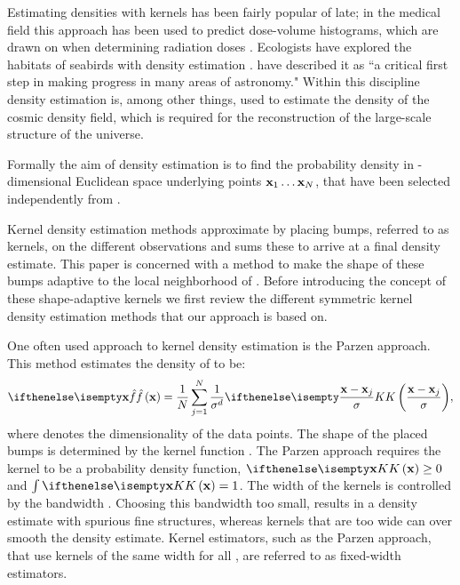 Estimating densities with kernels has been fairly popular of late; in the medical field this approach has been used to predict dose-volume histograms, which are drawn on when determining radiation doses \cite{SkarpmanDose2015}. Ecologists have explored the habitats of seabirds with density estimation \cite{lees2016using}. \textcite{ferdosi2011comparison} have described it as ``a critical first step in making progress in many areas of astronomy."  Within this discipline  density estimation is, among other things, used to estimate the density of the cosmic density field, which is required for the reconstruction of the large-scale structure of the universe.

Formally the aim of density estimation is to find the probability density \varDensityFunction{\varPattern} in \varDim-dimensional Euclidean space underlying \varNumPatterns points $\varPattern[1] \dotsc \varPattern[\varNumPatterns]$, that have been selected independently from \varDensityFunction{\varPattern}. 

Kernel density estimation methods approximate \varDensityFunction{\varPattern} by placing bumps, referred to as kernels, on the different observations and sums these to arrive at a final density estimate. This paper is concerned with a method to make the shape of these bumps adaptive to the local neighborhood of \varPattern. Before introducing the concept of these shape-adaptive kernels we first review the different symmetric kernel density estimation methods that our approach is based on. 

	One often used approach to kernel density estimation is the Parzen approach\cite{parzen1962estimation}. This method estimates the density of \varPattern to be:
	\begin{equation}\label{eq:1:parzen}
		\varEstimatedDensityFunction{\varPattern} = \frac{1}{\varNumPatterns}\sum_{j = 1}^{\varNumPatterns} \frac{1}{\varBandwidth^\varDim}\varKernel{\frac{\varPattern - \varPattern[j]}{\varBandwidth}},
	\end{equation}
	where \varDim denotes the dimensionality of the data points. The shape of the placed bumps is determined by the kernel function \varKernel{}.  The Parzen approach requires the kernel to be a probability density function, \ie $\varKernel{\varPattern} \geq 0$ and $\int \varKernel{\varPattern} = 1$. 
	The width of the kernels is controlled by the bandwidth \varBandwidth \cite{silverman1986density}. Choosing this bandwidth too small, results in a density estimate with spurious fine structures, whereas kernels that are too wide can over smooth the density estimate. Kernel estimators, such as the Parzen approach, that use kernels of the same width for all \varPattern[j], are referred to as fixed-width estimators.

